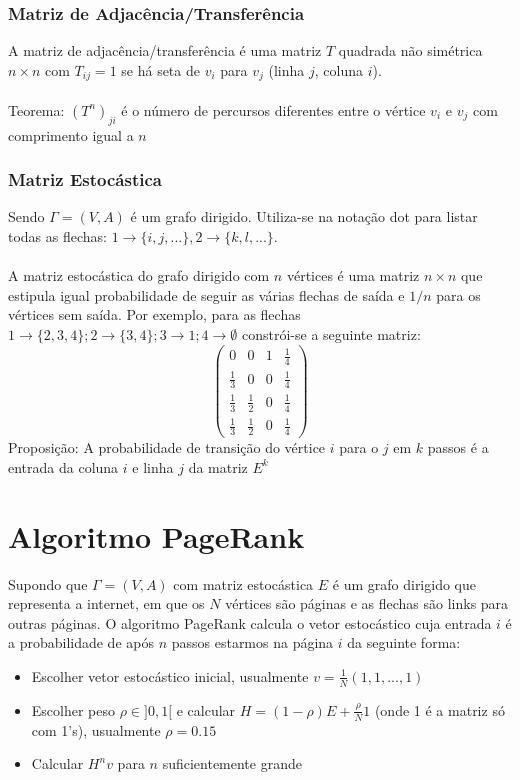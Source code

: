 \documentclass[10pt,a4paper]{report}
\begin{document}
\subsubsection{Matriz de Adjacência/Transferência}
A matriz de adjacência/transferência é uma matriz $T$ quadrada não simétrica $n \times n$ com $T_{ij} = 1$ se há seta de $v_i$ para $v_j$ (linha $j$, coluna $i$).\\
\\
Teorema: $(T^n)_{ji}$ é o número de percursos diferentes entre o vértice $v_i$ e $v_j$ com comprimento igual a $n$
\subsubsection{Matriz Estocástica}
Sendo $\Gamma = (V,A)$ é um grafo dirigido. Utiliza-se na notação dot para listar todas as flechas: $1 \rightarrow \{i,j,...\}, 2 \rightarrow \{k,l,...\}$.\\
\\
A matriz estocástica do grafo dirigido com $n$ vértices é uma matriz $n \times n$ que estipula igual probabilidade de seguir as várias flechas de saída e $1/n$ para os vértices sem saída. Por exemplo, para as flechas $1 \rightarrow\{2,3,4\}; 2 \rightarrow \{3,4\}; 3 \rightarrow 1; 4 \rightarrow \emptyset$ constrói-se a seguinte matriz:
$$
\begin{pmatrix}
0 & 0 & 1 & \frac{1}{4}\\
\frac{1}{3} & 0 & 0 & \frac{1}{4}\\
\frac{1}{3} & \frac{1}{2} & 0 & \frac{1}{4}\\
\frac{1}{3} & \frac{1}{2} & 0 & \frac{1}{4}
\end{pmatrix}
$$
Proposição: A probabilidade de transição do vértice $i$ para o $j$ em $k$ passos é a entrada da coluna $i$ e linha $j$ da matriz $E^k$
\section{Algoritmo PageRank}
Supondo que $\Gamma = (V,A)$ com matriz estocástica $E$ é um grafo dirigido que representa a internet, em que os $N$ vértices são páginas e as flechas são links para outras páginas. O algoritmo PageRank calcula o vetor estocástico cuja entrada $i$ é a probabilidade de após $n$ passos estarmos na página $i$ da seguinte forma:
\begin{itemize}
\item Escolher vetor estocástico inicial, usualmente $v = \frac{1}{N}(1,1,...,1)$
\item Escolher peso $\rho \in ]0,1[$ e calcular $H = (1 - \rho)E + \frac{\rho}{N}1$ (onde 1 é a matriz só com 1's), usualmente $\rho = 0.15$
\item Calcular $H^nv$ para $n$ suficientemente grande
\end{itemize}
\end{document}
